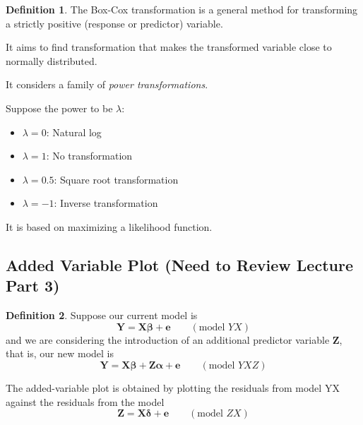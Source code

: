\documentclass[11pt]{article}
\newenvironment{indentone}{\begin{adjustwidth}{3em}{0em}}{\end{adjustwidth}}
\newcommand\VEC{\bm}{}
\theoremstyle{definition}
\newtheorem{definition}{Definition}[section]
\numberwithin{equation}{section}
\begin{document}
\begin{definition}
The Box-Cox transformation is a general method for transforming a strictly positive (response or predictor) variable.
\end{definition}
\begin{writenotes}
 It aims to find transformation that makes the transformed variable close to normally distributed.

 It considers a family of \textit{power transformations}.

\begin{indentone}Suppose the power to be $\lambda$:
 \begin{itemize}

   \item $\lambda=0$: Natural log

   \item $\lambda=1$: No transformation

   \item $\lambda=0.5$: Square root transformation

   \item $\lambda=-1$: Inverse transformation
 \end{itemize}
\end{indentone}
 It is based on maximizing a likelihood function.
\end{writenotes}

\subsection{Added Variable Plot (Need to Review Lecture Part 3)}

\begin{definition}
  Suppose our current model is 
  \begin{equation}
    \VEC{Y}=\VEC{X \beta} + \VEC{e}\qquad(\text{model } YX)
  \end{equation}
  and we are considering the introduction of an additional predictor variable $\VEC{Z}$, that is, our new model is
  \begin{equation}
    \VEC{Y}=\VEC{X\beta + Z\alpha + e}\qquad(\text{model }YXZ)
  \end{equation}

  The added-variable plot is obtained by plotting the residuals from model YX against the residuals from the model
  \begin{equation}
    \VEC{Z}=\VEC{X\delta} + \VEC{e}\qquad(\text{model }ZX)
  \end{equation}
\end{definition}
\end{document}
